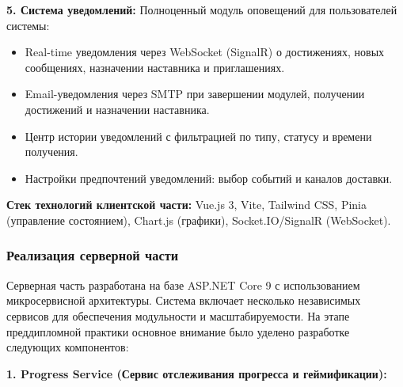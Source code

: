 \textbf{5. Система уведомлений:}
Полноценный модуль оповещений для пользователей системы:
\begin{itemize}
	\item Real-time уведомления через WebSocket (SignalR) о достижениях, новых сообщениях, назначении наставника и приглашениях.
	\item Email-уведомления через SMTP при завершении модулей, получении достижений и назначении наставника.
	\item Центр истории уведомлений с фильтрацией по типу, статусу и времени получения.
	\item Настройки предпочтений уведомлений: выбор событий и каналов доставки.
\end{itemize}

\textbf{Стек технологий клиентской части:} Vue.js 3, Vite, Tailwind CSS, Pinia (управление состоянием), Chart.js (графики), Socket.IO/SignalR (WebSocket).

\subsubsection*{Реализация серверной части}

Серверная часть разработана на базе ASP.NET Core 9 с использованием микросервисной архитектуры. Система включает несколько независимых сервисов для обеспечения модульности и масштабируемости. На этапе преддипломной практики основное внимание было уделено разработке следующих компонентов:

\textbf{1. Progress Service (Сервис отслеживания прогресса и геймификации):}

